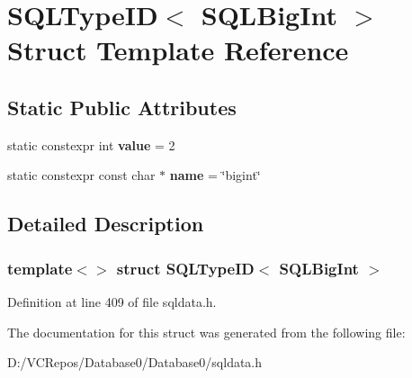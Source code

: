 \hypertarget{struct_s_q_l_type_i_d_3_01_s_q_l_big_int_01_4}{}\section{S\+Q\+L\+Type\+ID$<$ S\+Q\+L\+Big\+Int $>$ Struct Template Reference}
\label{struct_s_q_l_type_i_d_3_01_s_q_l_big_int_01_4}
\subsection*{Static Public Attributes}
\begin{DoxyCompactItemize}
\item 
\mbox{\label{struct_s_q_l_type_i_d_3_01_s_q_l_big_int_01_4_a41eebd8ddca6e4fce4dfe16552427db9}} 
static constexpr int {\bfseries value} = 2
\item 
\mbox{\label{struct_s_q_l_type_i_d_3_01_s_q_l_big_int_01_4_ad96c0d35b28645c457cfdc62b5bb37ef}} 
static constexpr const char $\ast$ {\bfseries name} = \char`\"{}bigint\char`\"{}
\end{DoxyCompactItemize}


\subsection{Detailed Description}
\subsubsection*{template$<$$>$\newline
struct S\+Q\+L\+Type\+I\+D$<$ S\+Q\+L\+Big\+Int $>$}



Definition at line 409 of file sqldata.\+h.



The documentation for this struct was generated from the following file\+:\begin{DoxyCompactItemize}
\item 
D\+:/\+V\+C\+Repos/\+Database0/\+Database0/sqldata.\+h\end{DoxyCompactItemize}
